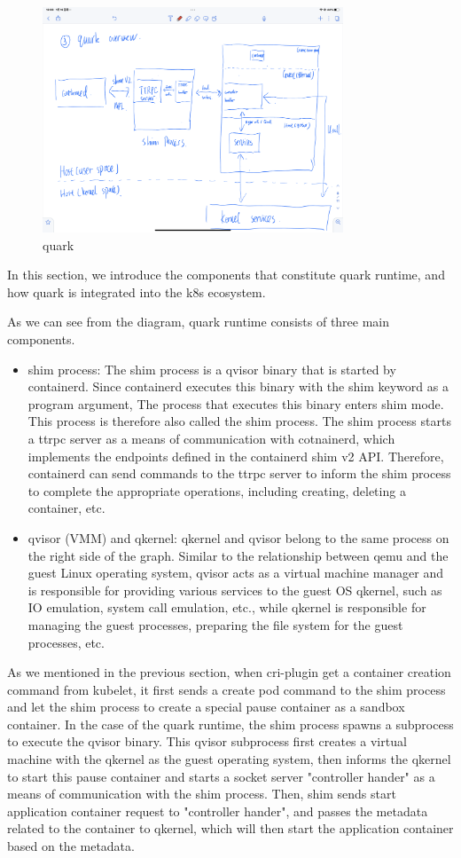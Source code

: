 \begin{figure}[H]
    \centering
    \includegraphics[width=0.8\textwidth]{images/IMG_4415.PNG}
    \caption[quark]{quark}
    \label{fig:quark}
\end{figure}
In this section, we introduce the components that constitute quark runtime, and how quark is integrated into the k8s ecosystem.

As we can see from the diagram, quark runtime consists of three main components.
\begin{itemize}
    \item  shim process: The shim process is a qvisor binary that is started by containerd. Since containerd executes this binary with the shim keyword as a program argument, The process that executes this binary enters shim mode. This process  is therefore also called the shim process. The shim process starts a ttrpc server as a means of communication with cotnainerd, which implements the endpoints defined in the containerd shim v2 API. Therefore, containerd can send commands to the ttrpc server to inform the shim process to complete the appropriate operations, including creating, deleting a container, etc.
    \item  qvisor (VMM) and qkernel: qkernel and qvisor belong to the same process on the right side of the graph. Similar to the relationship between qemu and the guest Linux operating system, qvisor acts as a virtual machine manager and is responsible for providing various services to the guest OS qkernel, such as IO emulation, system call emulation, etc., while qkernel is responsible for managing the guest processes, preparing the file system for the guest processes, etc.
\end{itemize}
As we mentioned in the previous section, when cri-plugin get a container creation command from kubelet, it first sends a create pod command to the shim process and let the shim process to create a special 
pause container as a sandbox container. In the case of the quark runtime, the shim process spawns a subprocess to execute the qvisor binary. This qvisor subprocess first creates a virtual 
machine with the qkernel as the guest operating system, then informs the qkernel to start this pause container and starts a socket server "controller hander" as a means of communication with 
the shim process. Then, shim sends start application container request to "controller hander", and passes the metadata related to the container to qkernel, 
which will then start the application container based on the metadata.

